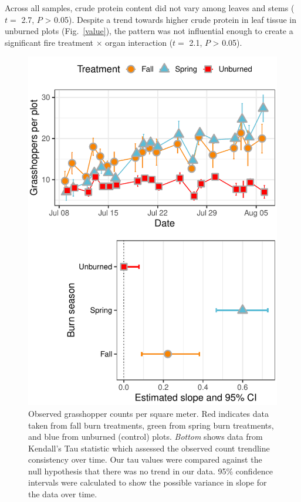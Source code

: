 \documentclass[referee, 
	            sn-basic]
           {sn-jnl}
\begin{document}
\begin{linenumbers}
Across all samples, crude protein content did not vary among leaves and
stems (\(t =\) 2.7, \(P\) \textgreater{} 0.05). Despite a trend towards
higher crude protein in leaf tissue in unburned plots (Fig.~\ref{value}), the
pattern was not influential enough to create a significant fire
treatment \(\times\) organ interaction (\(t =\) 2.1, \(P\)
\textgreater{} 0.05).

\begin{figure}
\centering
\includegraphics{tau_gg-1.pdf}
\caption{Observed grasshopper counts per square meter. 
Red indicates data taken from fall burn treatments, green from spring burn treatments, and blue from unburned (control) plots.
\emph{Bottom} shows data from Kendall's Tau statistic which assessed the observed count trendline consistency over time. 
Our tau values were compared against the null hypothesis that there was no trend in our data. 
95\% confidence intervals were calculated to show the possible variance in slope for the data over time.}
\label{tau} %
\end{figure}


\end{linenumbers}
\end{document}
